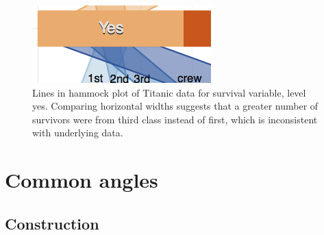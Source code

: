 \begin{figure}[htbp]
\centering
\includegraphics[width = .75\linewidth]{images/zoom_hammock}
\caption{Lines in hammock plot of Titanic data for survival variable, level yes. Comparing horizontal widths suggests that a greater number of survivors were from third class instead of first, which is inconsistent with underlying data.}
\end{figure}
%

\section{Common angles}


\subsection{Construction}


